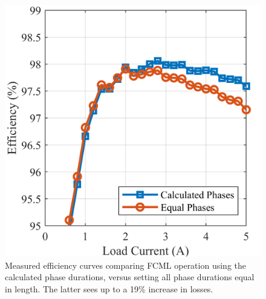 \begin{figure}[t]
\begin{minipage}[H]{0.3\linewidth}
  
     \centering
    \includegraphics[width=1\linewidth]{Figures/corr_vs_incorr_Eff_vs_load.png}
    \caption{Measured efficiency curves comparing FCML operation using the calculated phase durations, versus setting all phase durations equal in length. The latter sees up to a 19\% increase in losses.}
    \label{fig:corr_vs_incorr}
  

\end{minipage}
\end{figure}
